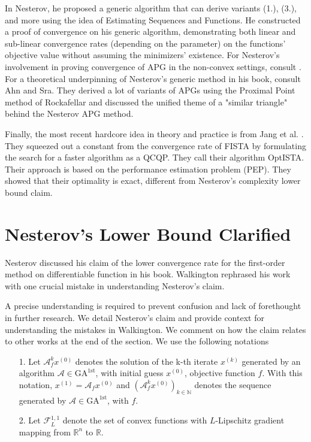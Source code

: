 \documentclass[]{article}
\theoremstyle{definition}
\numberwithin{equation}{subsection}
\begin{document}
        In Nesterov\cite{nesterov_lecture_2018}, he proposed a generic algorithm that can derive variants (1.), (3.), and more using the idea of Estimating Sequences and Functions. 
        He constructed a proof of convergence on his generic algorithm, demonstrating both linear and sub-linear convergence rates (depending on the parameter) on the functions' objective value without assuming the minimizers' existence. 
        For Nesterov's involvement in proving convergence of APG in the non-convex settings, consult \cite{necoara_linear_2019}. 
        For a theoretical underpinning of Nesterov's generic method in his book, consult Ahn and Sra\cite{ahn_understanding_2022}. 
        They derived a lot of variants of APGs using the Proximal Point method of Rockafellar and discussed the unified theme of a "similar triangle" behind the Nesterov APG method. 
        \par
        Finally, the most recent hardcore idea in theory and practice is from Jang et al. \cite{jang_computer-assisted_2023}. 
        They squeezed out a constant from the convergence rate of FISTA by formulating the search for a faster algorithm as a QCQP. 
        They call their algorithm OptISTA. 
        Their approach is based on the performance estimation problem (PEP). 
        They showed that their optimality is exact, different from Nesterov's complexity lower bound claim. 


\section{Nesterov's Lower Bound Clarified}\label{sec:optimal_lower_bound}
    Nesterov discussed his claim of the lower convergence rate for the first-order method on differentiable function in his book\cite{nesterov_lectures_2018}. 
    Walkington\cite{noel_nesterovs_nodate} rephrased his work with one crucial mistake in understanding Nesterov's claim. 
    \par
    A precise understanding is required to prevent confusion and lack of forethought in further research.
    We detail Nesterov's claim and provide context for understanding the mistakes in Walkington. 
    We comment on how the claim relates to other works at the end of the section. 
    \newcommand*{\GAfirst}{\text{GA}^{\text{1st}}} %
    We use the following notations
    \begin{itemize}
        \item [1.] Let $\mathcal A^k_fx^{(0)}$ denotes the solution of the k-th iterate $x^{(k)}$ generated by an algorithm $\mathcal A \in \GAfirst$, with initial guess $x^{(0)}$, objective function $f$. 
        With this notation, $x^{(1)} = \mathcal A_f x^{(0)}$ and $(\mathcal A_f^{k}x^{(0)})_{k \in \mathbb N}$ denotes the sequence generated by $\mathcal A \in \GAfirst$, with $f$.
        \item [2.] Let $\mathcal F^{1, 1}_L$ denote the set of convex functions with $L$-Lipschitz gradient mapping from $\mathbb R^n$ to $\mathbb R$. 
    \end{itemize}
\end{document}
